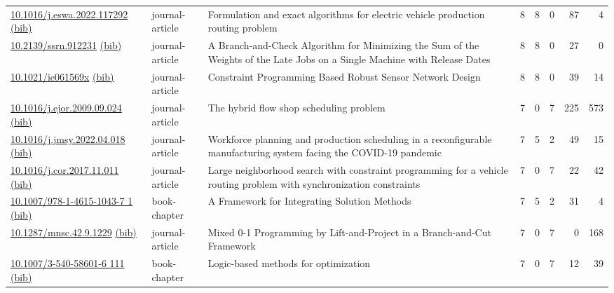{\begin{longtable}{p{5cm}lp{11cm}rrrrr}
\href{http://dx.doi.org/10.1016/j.eswa.2022.117292}{10.1016/j.eswa.2022.117292} \href{https://www.doi2bib.org/bib/10.1016/j.eswa.2022.117292}{(bib)} & journal-article & Formulation and exact algorithms for electric vehicle production routing problem & 8 & 8 & 0 & 87 & 4 \\
\href{http://dx.doi.org/10.2139/ssrn.912231}{10.2139/ssrn.912231} \href{https://www.doi2bib.org/bib/10.2139/ssrn.912231}{(bib)} & journal-article & A Branch-and-Check Algorithm for Minimizing the Sum of the Weights of the Late Jobs on a Single Machine with Release Dates & 8 & 8 & 0 & 27 & 0 \\
\href{http://dx.doi.org/10.1021/ie061569x}{10.1021/ie061569x} \href{https://www.doi2bib.org/bib/10.1021/ie061569x}{(bib)} & journal-article & Constraint Programming Based Robust Sensor Network Design & 8 & 8 & 0 & 39 & 14 \\
\href{http://dx.doi.org/10.1016/j.ejor.2009.09.024}{10.1016/j.ejor.2009.09.024} \href{https://www.doi2bib.org/bib/10.1016/j.ejor.2009.09.024}{(bib)} & journal-article & The hybrid flow shop scheduling problem & 7 & 0 & 7 & 225 & 573 \\
\href{http://dx.doi.org/10.1016/j.jmsy.2022.04.018}{10.1016/j.jmsy.2022.04.018} \href{https://www.doi2bib.org/bib/10.1016/j.jmsy.2022.04.018}{(bib)} & journal-article & Workforce planning and production scheduling in a reconfigurable manufacturing system facing the COVID-19 pandemic & 7 & 5 & 2 & 49 & 15 \\
\href{http://dx.doi.org/10.1016/j.cor.2017.11.011}{10.1016/j.cor.2017.11.011} \href{https://www.doi2bib.org/bib/10.1016/j.cor.2017.11.011}{(bib)} & journal-article & Large neighborhood search with constraint programming for a vehicle routing problem with synchronization constraints & 7 & 0 & 7 & 22 & 42 \\
\href{http://dx.doi.org/10.1007/978-1-4615-1043-7_1}{10.1007/978-1-4615-1043-7 1} \href{https://www.doi2bib.org/bib/10.1007/978-1-4615-1043-7_1}{(bib)} & book-chapter & A Framework for Integrating Solution Methods & 7 & 5 & 2 & 31 & 4 \\
\href{http://dx.doi.org/10.1287/mnsc.42.9.1229}{10.1287/mnsc.42.9.1229} \href{https://www.doi2bib.org/bib/10.1287/mnsc.42.9.1229}{(bib)} & journal-article & Mixed 0-1 Programming by Lift-and-Project in a Branch-and-Cut Framework & 7 & 0 & 7 & 0 & 168 \\
\href{http://dx.doi.org/10.1007/3-540-58601-6_111}{10.1007/3-540-58601-6 111} \href{https://www.doi2bib.org/bib/10.1007/3-540-58601-6_111}{(bib)} & book-chapter & Logic-based methods for optimization & 7 & 0 & 7 & 12 & 39 \\

\end{longtable}}
